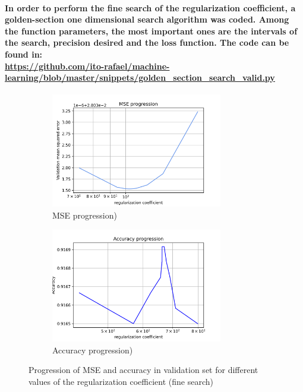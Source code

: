 \documentclass[a4paper]{article}    %
\begin{document}
\paragraph{In order to perform the fine search of the regularization coefficient, a golden-section one dimensional search algorithm was coded. Among the function parameters, the most important ones are the intervals of the search, precision desired and the loss function. The code can be found in:\\
\url{https://github.com/ito-rafael/machine-learning/blob/master/snippets/golden_section_search_valid.py}}

\begin{figure}[H]
    \centering
    \begin{subfigure}{0.48\textwidth}
        \centering
        \includegraphics[width=7.5cm]{alpha_MSE_fine_search}
        \caption{MSE progression)}
        \label{fig:alpha-fine-mse}
    \end{subfigure}
    \hfill
    \begin{subfigure}{0.48\textwidth}
        \centering
        \includegraphics[width=7.5cm]{alpha_ACCURACY_fine_search}
        \caption{Accuracy progression)}
        \label{fig:alpha-fine-acc}
    \end{subfigure}
    \hfill
    \caption{Progression of MSE and accuracy in validation set for different values of the regularization coefficient (fine search)}
    \label{fig:alpha_fine}
\end{figure}
\end{document}
